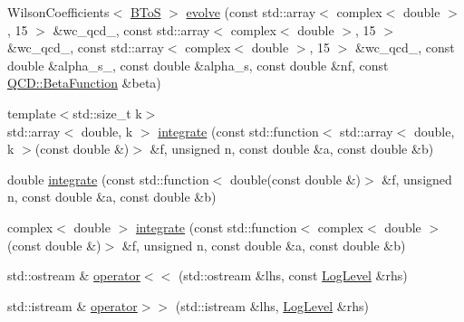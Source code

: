 \begin{DoxyCompactItemize}
\item 
WilsonCoefficients$<$ \hyperlink{structeos_1_1BToS}{BToS} $>$ \hyperlink{namespaceeos_a07bd8aab4adc1e31cfbd795b36f592ee}{evolve} (const std::array$<$ complex$<$ double $>$, 15 $>$ \&wc\_\-qcd\_, const std::array$<$ complex$<$ double $>$, 15 $>$ \&wc\_\-qcd\_, const std::array$<$ complex$<$ double $>$, 15 $>$ \&wc\_\-qcd\_, const double \&alpha\_\-s\_, const double \&alpha\_\-s, const double \&nf, const \hyperlink{classeos_1_1QCD_a1261bb4643fea3012beb0a9ea78b7dea}{QCD::BetaFunction} \&beta)
\end{DoxyCompactItemize}
\begin{Indent}{\bf }\par
{\em \label{_amgrpd41d8cd98f00b204e9800998ecf8427e}
 }\begin{DoxyCompactItemize}
\item 
{\footnotesize template$<$std::size\_\-t k$>$ }\\std::array$<$ double, k $>$ \hyperlink{namespaceeos_aa97e022b32760a5d657bc35b9151efb8}{integrate} (const std::function$<$ std::array$<$ double, k $>$(const double \&)$>$ \&f, unsigned n, const double \&a, const double \&b)
\item 
double \hyperlink{namespaceeos_ae905f169a81a2dd54d1116bc201ad41a}{integrate} (const std::function$<$ double(const double \&)$>$ \&f, unsigned n, const double \&a, const double \&b)
\item 
complex$<$ double $>$ \hyperlink{namespaceeos_ac60718e2ad5504caf40d52f07a86607d}{integrate} (const std::function$<$ complex$<$ double $>$(const double \&)$>$ \&f, unsigned n, const double \&a, const double \&b)
\item 
std::ostream \& \hyperlink{namespaceeos_a397c7661ab7dbc53ad04d52cd371c8aa}{operator$<$$<$} (std::ostream \&lhs, const \hyperlink{namespaceeos_ad6b42a08a08a1b63498f3f262bd15602}{LogLevel} \&rhs)
\item 
std::istream \& \hyperlink{namespaceeos_a28eec37f82312fce69a8c2b08b272ef9}{operator$>$$>$} (std::istream \&lhs, \hyperlink{namespaceeos_ad6b42a08a08a1b63498f3f262bd15602}{LogLevel} \&rhs)
\end{DoxyCompactItemize}
\end{Indent}


